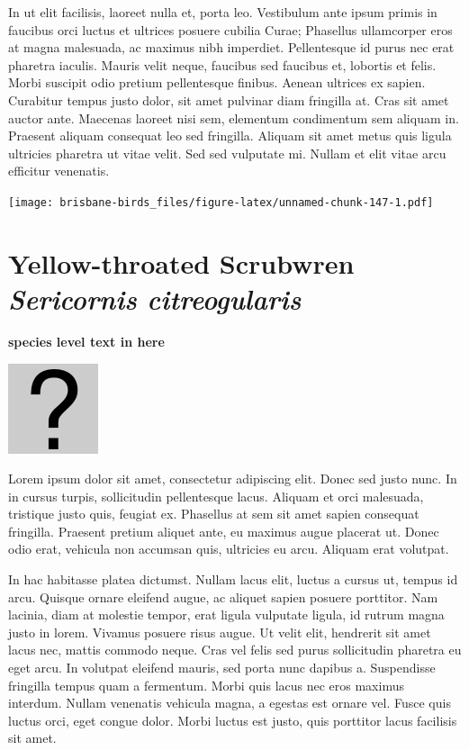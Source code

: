 \documentclass[]{book}
\let\origfigure\figure
\let\endorigfigure\endfigure
\renewenvironment{figure}[1][2] {
  \expandafter\origfigure\expandafter[H]
} {
  \endorigfigure
}
\begin{document}
In ut elit facilisis, laoreet nulla et, porta leo. Vestibulum ante ipsum
primis in faucibus orci luctus et ultrices posuere cubilia Curae;
Phasellus ullamcorper eros at magna malesuada, ac maximus nibh
imperdiet. Pellentesque id purus nec erat pharetra iaculis. Mauris velit
neque, faucibus sed faucibus et, lobortis et felis. Morbi suscipit odio
pretium pellentesque finibus. Aenean ultrices ex sapien. Curabitur
tempus justo dolor, sit amet pulvinar diam fringilla at. Cras sit amet
auctor ante. Maecenas laoreet nisi sem, elementum condimentum sem
aliquam in. Praesent aliquam consequat leo sed fringilla. Aliquam sit
amet metus quis ligula ultricies pharetra ut vitae velit. Sed sed
vulputate mi. Nullam et elit vitae arcu efficitur venenatis.

\begin{figure}
\centering
\texttt{[image: brisbane-birds\_files/figure-latex/unnamed-chunk-147-1.pdf]}
\caption{\label{fig:unnamed-chunk-147}insert figure caption}
\end{figure}

\section{\texorpdfstring{Yellow-throated Scrubwren \emph{Sericornis
citreogularis}}{Yellow-throated Scrubwren Sericornis citreogularis}}\label{yellow-throated-scrubwren-sericornis-citreogularis}

\textbf{species level text in here}

\begin{figure}
\centering
\includegraphics{assets/missing.png}
\caption{No image for species}
\end{figure}

Lorem ipsum dolor sit amet, consectetur adipiscing elit. Donec sed justo
nunc. In in cursus turpis, sollicitudin pellentesque lacus. Aliquam et
orci malesuada, tristique justo quis, feugiat ex. Phasellus at sem sit
amet sapien consequat fringilla. Praesent pretium aliquet ante, eu
maximus augue placerat ut. Donec odio erat, vehicula non accumsan quis,
ultricies eu arcu. Aliquam erat volutpat.

In hac habitasse platea dictumst. Nullam lacus elit, luctus a cursus ut,
tempus id arcu. Quisque ornare eleifend augue, ac aliquet sapien posuere
porttitor. Nam lacinia, diam at molestie tempor, erat ligula vulputate
ligula, id rutrum magna justo in lorem. Vivamus posuere risus augue. Ut
velit elit, hendrerit sit amet lacus nec, mattis commodo neque. Cras vel
felis sed purus sollicitudin pharetra eu eget arcu. In volutpat eleifend
mauris, sed porta nunc dapibus a. Suspendisse fringilla tempus quam a
fermentum. Morbi quis lacus nec eros maximus interdum. Nullam venenatis
vehicula magna, a egestas est ornare vel. Fusce quis luctus orci, eget
congue dolor. Morbi luctus est justo, quis porttitor lacus facilisis sit
amet.
\end{document}
